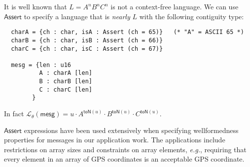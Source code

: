\documentclass[a4paper,UKenglish,cleveref, autoref, thm-restate]{lipics-v2021}
\newcommand{\eg}{\textit{e.g.}}
\newcommand{\konst}[1]{\ensuremath{\mathsf{#1}}}
\newcommand{\LangTheta}[1]{\ensuremath{{\mathcal L}_{\theta}({#1})}}
\begin{document}
\begin{example}[$A^n B^n C^n$]
It is well known that $L = A^n B^n C^n$ is not a context-free
language. We can use \konst{Assert} to specify a language that is
\emph{nearly} $L$ with the following contiguity type:
%
{\small
\begin{verbatim}
  charA = {ch : char, isA : Assert (ch = 65)}   (* "A" = ASCII 65 *)
  charB = {ch : char, isB : Assert (ch = 66)}
  charC = {ch : char, isC : Assert (ch = 67)}

  mesg = {len : u16
          A : charA [len]
          B : charB [len]
          C : charC [len]
        }
\end{verbatim}
}
\noindent In fact $\LangTheta{\konst{mesg}} = u \cdot A^{\konst{toN}(u)} \cdot
B^{\konst{toN}(u)} \cdot C^{\konst{toN}(u)}$.
\end{example}



\noindent \konst{Assert} expressions have been used extensively when
specifying wellformedness properties for messages in our application
work. The applications include restrictions on array sizes and
constraints on array elements, \eg, requiring that every element in an
array of GPS coordinates is an acceptable GPS coordinate.
\end{document}
